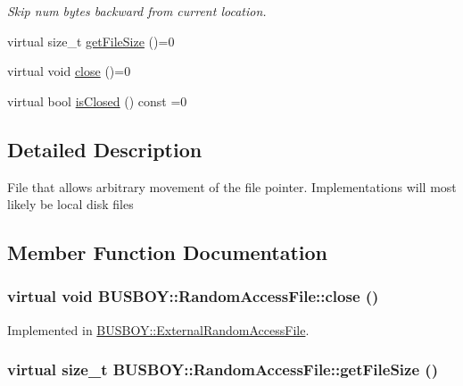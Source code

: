 \begin{DoxyCompactItemize}
\begin{DoxyCompactList}\small\item\em Skip num bytes backward from current location. \item\end{DoxyCompactList}\item 
virtual size\_\-t \hyperlink{classBUSBOY_1_1RandomAccessFile_aa06a60e534e2314196192a7c3b64bd77}{getFileSize} ()=0
\item 
virtual void \hyperlink{classBUSBOY_1_1RandomAccessFile_a242d930b0e47a42bcc23c5f3e18bfb48}{close} ()=0
\item 
virtual bool \hyperlink{classBUSBOY_1_1RandomAccessFile_ab31acc588485ee4832e96c907fe998fd}{isClosed} () const =0
\end{DoxyCompactItemize}


\subsection{Detailed Description}
File that allows arbitrary movement of the file pointer. Implementations will most likely be local disk files 

\subsection{Member Function Documentation}
\hypertarget{classBUSBOY_1_1RandomAccessFile_a242d930b0e47a42bcc23c5f3e18bfb48}{
\subsubsection[{close}]{\setlength{\rightskip}{0pt plus 5cm}virtual void BUSBOY::RandomAccessFile::close ()}}
\label{classBUSBOY_1_1RandomAccessFile_a242d930b0e47a42bcc23c5f3e18bfb48}


Implemented in \hyperlink{classBUSBOY_1_1ExternalRandomAccessFile_a9a59b70aa2a9cb50c484bf6a9e7ef8cd}{BUSBOY::ExternalRandomAccessFile}.\hypertarget{classBUSBOY_1_1RandomAccessFile_aa06a60e534e2314196192a7c3b64bd77}{
\subsubsection[{getFileSize}]{\setlength{\rightskip}{0pt plus 5cm}virtual size\_\-t BUSBOY::RandomAccessFile::getFileSize ()}}
\label{classBUSBOY_1_1RandomAccessFile_aa06a60e534e2314196192a7c3b64bd77}


